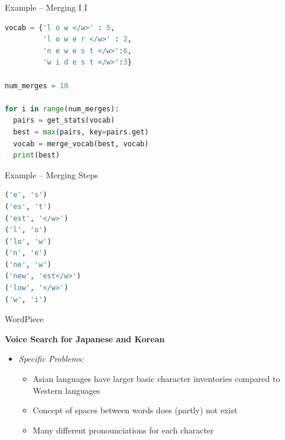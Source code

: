 \documentclass[11pt,compress,t,notes=noshow, xcolor=table]{beamer}
\begin{document}

\begin{vbframe}{Example -- Merging I I}

\begin{lstlisting}[language=Python]
vocab = {'l o w </w>' : 5, 
         'l o w e r </w>' : 2, 
         'n e w e s t </w>':6, 
         'w i d e s t </w>':3}

num_merges = 10

for i in range(num_merges):
  pairs = get_stats(vocab)
  best = max(pairs, key=pairs.get)
  vocab = merge_vocab(best, vocab)
  print(best)
\end{lstlisting}

\end{vbframe}


\begin{vbframe}{Example -- Merging Steps}

\begin{lstlisting}[language=Python]
('e', 's')
('es', 't')
('est', '</w>')
('l', 'o')
('lo', 'w')
('n', 'e')
('ne', 'w')
('new', 'est</w>')
('low', '</w>')
('w', 'i')
\end{lstlisting}

\end{vbframe}


\begin{frame}{WordPiece}

\vfill

	\textbf{Voice Search for Japanese and Korean \href{https://storage.googleapis.com/pub-tools-public-publication-data/pdf/37842.pdf}{}}

	\begin{itemize}
		\item \textit{Specific Problems:} 
			\begin{itemize}
				\item Asian languages have larger basic character inventories compared to Western languages
				\item Concept of spaces between words does (partly) not exist
				\item Many different pronounciations for each character
			\end{itemize}
	\end{itemize}
	
\vfill

\end{frame}
\end{document}
